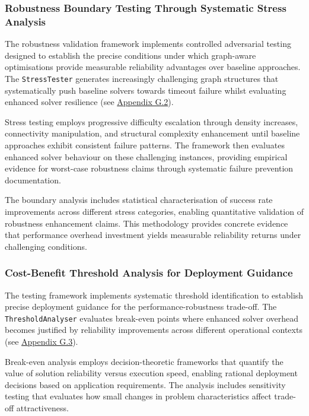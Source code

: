 \subsubsection{Robustness Boundary Testing Through Systematic Stress Analysis}
\label{sec:robustness-boundary-testing}

The robustness validation framework implements controlled adversarial testing designed to establish the precise conditions under which graph-aware optimisations provide measurable reliability advantages over baseline approaches. The \texttt{StressTester} generates increasingly challenging graph structures that systematically push baseline solvers towards timeout failure whilst evaluating enhanced solver resilience (see \hyperref[appendix:stress-generation]{Appendix G.2}).

Stress testing employs progressive difficulty escalation through density increases, connectivity manipulation, and structural complexity enhancement until baseline approaches exhibit consistent failure patterns. The framework then evaluates enhanced solver behaviour on these challenging instances, providing empirical evidence for worst-case robustness claims through systematic failure prevention documentation.

The boundary analysis includes statistical characterisation of success rate improvements across different stress categories, enabling quantitative validation of robustness enhancement claims. This methodology provides concrete evidence that performance overhead investment yields measurable reliability returns under challenging conditions.

\subsubsection{Cost-Benefit Threshold Analysis for Deployment Guidance}
\label{sec:cost-benefit-analysis}

The testing framework implements systematic threshold identification to establish precise deployment guidance for the performance-robustness trade-off. The \texttt{Threshold\-Analyser} evaluates break-even points where enhanced solver overhead becomes justified by reliability improvements across different operational contexts (see \hyperref[appendix:threshold-analysis]{Appendix G.3}).

Break-even analysis employs decision-theoretic frameworks that quantify the value of solution reliability versus execution speed, enabling rational deployment decisions based on application requirements. The analysis includes sensitivity testing that evaluates how small changes in problem characteristics affect trade-off attractiveness.

